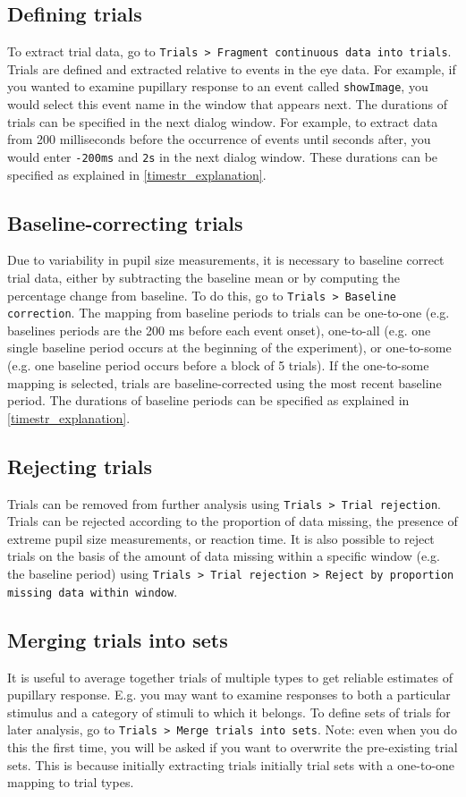 \documentclass{article}
\newcommand{\erp}{Trials }
\begin{document}
\subsection{Defining trials}
To extract trial data, go to \texttt{\erp > Fragment continuous data into trials}. Trials are defined and extracted relative to events in the eye data. For example, if you wanted to examine pupillary response to an event called \texttt{showImage}, you would select this event name in the window that appears next. The durations of trials can be specified in the next dialog window. For example, to extract data from 200 milliseconds before the occurrence of events until seconds after, you would enter \texttt{-200ms} and \texttt{2s} in the next dialog window. These durations can be specified as explained in \ref{timestr_explanation}.
\subsection{Baseline-correcting trials}
Due to variability in pupil size measurements, it is necessary to baseline correct trial data, either by subtracting the baseline mean or by computing the percentage change from baseline. To do this, go to \texttt{\erp > Baseline correction}. The mapping from baseline periods to trials can be one-to-one (e.g. baselines periods are the 200 ms before each event onset), one-to-all (e.g. one single baseline period occurs at the beginning of the experiment), or one-to-some (e.g. one baseline period occurs before a block of 5 trials). If the one-to-some mapping is selected, trials are baseline-corrected using the most recent baseline period. The durations of baseline periods can be specified as explained in \ref{timestr_explanation}.
\subsection{Rejecting trials}
Trials can be removed from further analysis using \texttt{\erp > Trial rejection}. Trials can be rejected according to the proportion of data missing, the presence of extreme pupil size measurements, or reaction time. It is also possible to reject trials on the basis of the amount of data missing within a specific window (e.g. the baseline period) using \texttt{\erp > Trial rejection > Reject by proportion missing data within window}.
\subsection{Merging trials into sets} \label{trialsets}
It is useful to average together trials of multiple types to get reliable estimates of pupillary response. E.g. you may want to examine responses to both a particular stimulus and a category of stimuli to which it belongs. To define sets of trials for later analysis, go to \texttt{\erp > Merge trials into sets}. Note: even when you do this the first time, you will be asked if you want to overwrite the pre-existing trial sets. This is because initially extracting trials initially trial sets with a one-to-one mapping to trial types.
\end{document}
